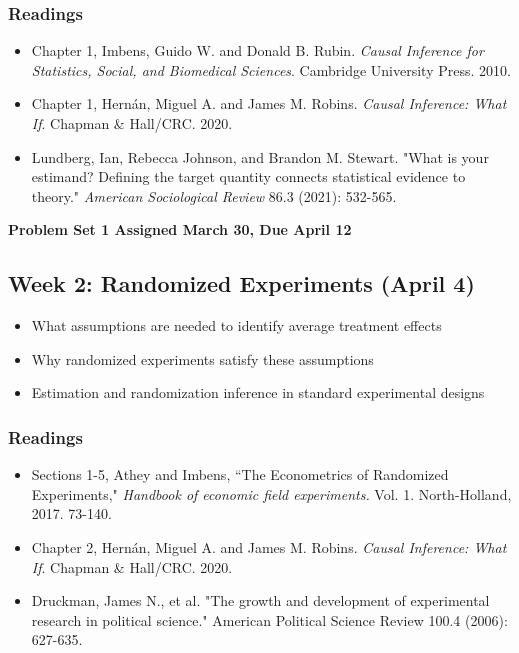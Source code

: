 \documentclass[11pt, article, oneside]{memoir}
\theoremstyle{Assumption}
\begin{document}
\subsubsection*{Readings}

\begin{itemize}
\item Chapter 1, Imbens, Guido W. and Donald B. Rubin. \emph{Causal Inference for Statistics, Social, and Biomedical Sciences}. Cambridge University Press.  2010.
\item Chapter 1, Hern\'an, Miguel A. and  James M. Robins. \emph{Causal Inference: What If}.  Chapman \& Hall/CRC. 2020.
\item Lundberg, Ian, Rebecca Johnson, and Brandon M. Stewart. "What is your estimand? Defining the target quantity connects statistical evidence to theory." \textit{American Sociological Review} 86.3 (2021): 532-565.
\end{itemize}

\textbf{Problem Set 1 Assigned March 30, Due April 12}

\subsection{Week 2: Randomized Experiments (April 4)}

\begin{itemize}
\item What assumptions are needed to identify average treatment effects
\item Why randomized experiments satisfy these assumptions
\item Estimation and randomization inference in standard experimental designs
\end{itemize}

\subsubsection*{Readings}

\begin{itemize}
\item Sections 1-5, Athey and Imbens, ``The Econometrics of Randomized Experiments,"  \textit{Handbook of economic field experiments.} Vol. 1. North-Holland, 2017. 73-140. 
\item Chapter 2, Hern\'an, Miguel A. and  James M. Robins. \textit{Causal Inference: What If}.  Chapman \& Hall/CRC. 2020.
\item Druckman, James N., et al. "The growth and development of experimental research in political science." American Political Science Review 100.4 (2006): 627-635.
\end{itemize}
\end{document}
